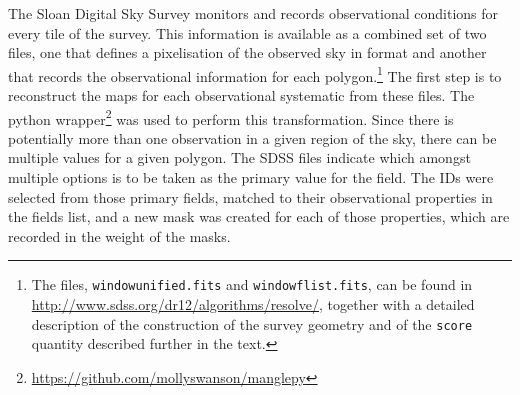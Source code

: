 The Sloan Digital Sky Survey monitors and records observational conditions for every tile of the survey. This information is available as a combined set of two files, one that defines a pixelisation of the observed sky in \mangle format and another that records the observational information for each \mangle polygon.\footnote{The files, \texttt{window\textunderscore unified.fits} and \texttt{window\textunderscore flist.fits}, can be found in \url{http://www.sdss.org/dr12/algorithms/resolve/}, together with a detailed description of the construction of the survey geometry and of the \texttt{score} quantity described further in the text.} The first step is to reconstruct the \mangle maps for each observational systematic from these files. The \mangle python wrapper\footnote{\url{https://github.com/mollyswanson/manglepy}} was used to perform this transformation. Since there is potentially more than one observation in a given region of the sky, there can be multiple values for a given polygon. The SDSS files indicate which amongst multiple options is to be taken as the primary value for the field. The IDs were selected from those primary fields, matched to their observational properties in the fields list, and a new \mangle mask was created for each of those properties, which are recorded in the weight of the masks.

